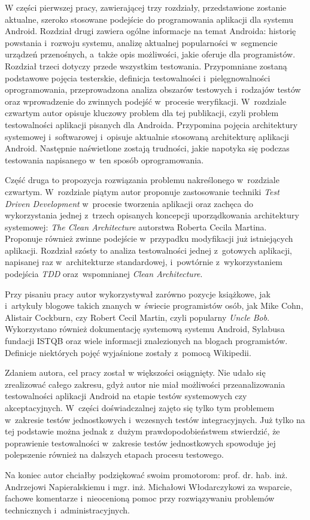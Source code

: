 W części pierwszej pracy, zawierającej trzy rozdziały, przedstawione zostanie aktualne, szeroko stosowane podejście do programowania aplikacji dla systemu Android. Rozdział drugi zawiera ogólne informacje na temat Androida: historię powstania i~rozwoju systemu, analizę aktualnej popularności w~segmencie urządzeń przenośnych, a~także opis możliwości, jakie oferuje dla programistów. Rozdział trzeci dotyczy przede wszystkim testowania. Przypomniane zostaną podstawowe pojęcia testerskie, definicja testowalności i~pielęgnowalności oprogramowania, przeprowadzona analiza obszarów testowych i~rodzajów testów oraz wprowadzenie do zwinnych podejść w~procesie weryfikacji. W~rozdziale czwartym autor opisuje kluczowy problem dla tej publikacji, czyli problem testowalności aplikacji pisanych dla Androida. Przypomina pojęcia architektury systemowej i~softwarowej i~opisuje aktualnie stosowaną architekturę aplikacji Android. Następnie naświetlone zostają trudności, jakie napotyka się podczas testowania napisanego w~ten sposób oprogramowania.

Część druga to propozycja rozwiązania problemu nakreślonego w~rozdziale czwartym. W~rozdziale piątym autor proponuje zastosowanie techniki \textit{Test Driven Development} w~procesie tworzenia aplikacji oraz zachęca do wykorzystania jednej z~trzech opisanych koncepcji uporządkowania architektury systemowej: \textit{The Clean Architecture} autorstwa Roberta Cecila Martina. Proponuje również zwinne podejście w~przypadku modyfikacji już istniejących aplikacji. Rozdział szósty to analiza testowalności jednej z~gotowych aplikacji, napisanej raz w~architekturze standardowej, i~powtórnie z~wykorzystaniem podejścia \textit{TDD} oraz~wspomnianej \textit{Clean Architecture}.

Przy pisaniu pracy autor wykorzystywał zarówno pozycje książkowe, jak i~artykuły blogowe takich znanych w~świecie programistów osób, jak Mike Cohn, Alistair Cockburn, czy Robert Cecil Martin, czyli popularny \textit{Uncle Bob}. Wykorzystano również dokumentację systemową systemu Android, Sylabusa fundacji ISTQB oraz wiele informacji znalezionych na blogach programistów. Definicje niektórych pojęć wyjaśnione zostały z~pomocą Wikipedii. 

Zdaniem autora, cel pracy został w większości osiągnięty. Nie udało się zrealizować  całego zakresu, gdyż autor nie miał możliwości przeanalizowania testowalności aplikacji Android na etapie testów systemowych czy akceptacyjnych. W~części doświadczalnej zajęto się tylko tym problemem w~zakresie testów jednostkowych i~wczesnych testów integracyjnych. Już tylko na tej podstawie można jednak z~dużym prawdopodobieństwem stwierdzić, że poprawienie testowalności w~zakresie testów jednostkowych spowoduje jej polepszenie również na dalszych etapach procesu testowego.

Na koniec autor chciałby podziękować swoim promotorom: prof. dr. hab. inż. Andrzejowi Napieralskiemu i mgr. inż. Michałowi Włodarczykowi za wsparcie, fachowe komentarze i~nieocenioną pomoc przy rozwiązywaniu problemów technicznych i~administracyjnych.


